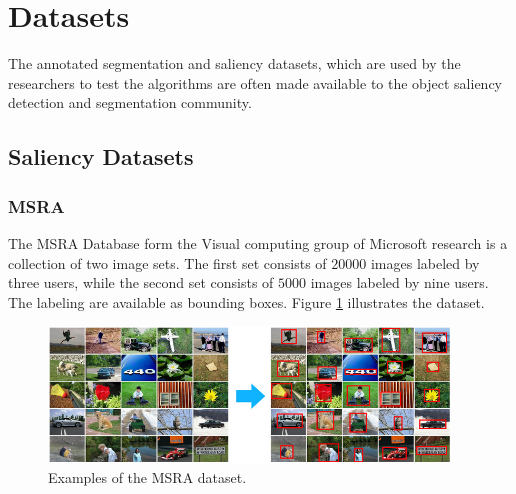 \section{Datasets}
\label{sec:db}

The annotated segmentation and saliency datasets, which are used by the researchers to test the algorithms are often made available to the object saliency detection and segmentation community.

\subsection{Saliency Datasets}
\subsubsection{MSRA}
The MSRA  Database form the Visual computing group of Microsoft  research \cite{msra_db} is a collection of two image sets. The first set consists of $20 000$ images labeled by three users, while the second set consists of $5000$ images labeled by nine users. The labeling are available as bounding boxes. Figure \ref{fig:msra} illustrates the dataset.
\begin{figure}[H]
\begin{center}
\includegraphics[width=0.95\textwidth]{fig/MSRA}
\end{center}
\caption{Examples of the MSRA dataset.}
\label{fig:msra}
\end{figure}
